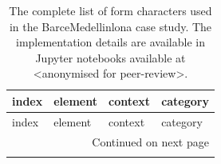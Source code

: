 \begin{longtable}{p{5cm}p{4cm}p{4cm}l}
\caption{The complete list of form characters used in the BarceMedellinlona case study. The implementation details are available
in Jupyter notebooks available at <anonymised for peer-review>.}
\label{tab:form_med} \\
\toprule
                                index &                         element &                    context &     category \\
\midrule
\endfirsthead

\toprule
                                index &                         element &                    context &     category \\
\midrule
\endhead
\midrule
\multicolumn{4}{r}{{Continued on next page}} \\
\midrule
\endfoot


\end{longtable}
